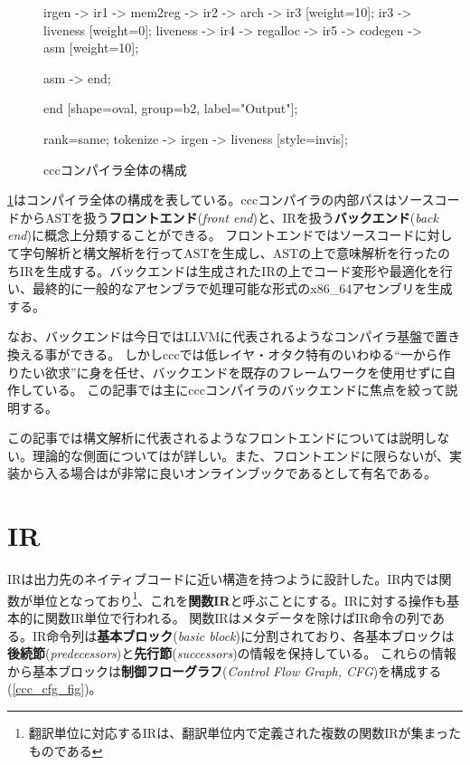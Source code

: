 \documentclass[uplatex,a4paper]{jsarticle}
\begin{document}
\begin{figure}[!ht]
\begin{center}
{{        irgen -> ir1 -> mem2reg -> ir2 -> arch -> ir3  [weight=10];
        ir3 -> liveness [weight=0];
        liveness -> ir4 -> regalloc -> ir5 -> codegen -> asm [weight=10];

      }
      asm -> end;

      end [shape=oval, group=b2, label="Output"];

      { rank=same; tokenize -> irgen -> liveness [style=invis]; }
    }
    \caption{cccコンパイラ全体の構成}
    \label{ccc_arch}
  \end{center}
\end{figure}

\cref{ccc_arch}はコンパイラ全体の構成を表している。cccコンパイラの内部パスはソースコードからASTを扱う\textbf{フロントエンド}(\textit{front end})と、IRを扱う\textbf{バックエンド}(\textit{back end})に概念上分類することができる。
フロントエンドではソースコードに対して字句解析と構文解析を行ってASTを生成し、ASTの上で意味解析を行ったのちIRを生成する。バックエンドは生成されたIRの上でコード変形や最適化を行い、最終的に一般的なアセンブラで処理可能な形式のx86\_64アセンブリを生成する。

なお、バックエンドは今日ではLLVM\cite{TheLLVM}に代表されるようなコンパイラ基盤で置き換える事ができる。
しかしcccでは低レイヤ・オタク特有のいわゆる``一から作りたい欲求''に身を任せ、バックエンドを既存のフレームワークを使用せずに自作している。
この記事では主にcccコンパイラのバックエンドに焦点を絞って説明する。

この記事では構文解析に代表されるようなフロントエンドについては説明しない。理論的な側面については\cite{av2009コンパイラ}が詳しい。また、フロントエンドに限らないが、実装から入る場合は\cite{ruicompilerbook}が非常に良いオンラインブックであるとして有名である。

\clearpage
\section{IR}
\label{ccc_ir}

IRは出力先のネイティブコードに近い構造を持つように設計した。IR内では関数が単位となっており\footnote{翻訳単位に対応するIRは、翻訳単位内で定義された複数の関数IRが集まったものである}、これを\textbf{関数IR}と呼ぶことにする。IRに対する操作も基本的に関数IR単位で行われる。
関数IRはメタデータを除けばIR命令の列である。IR命令列は\textbf{基本ブロック}(\textit{basic block})に分割されており、各基本ブロックは\textbf{後続節}(\textit{predecessors})と\textbf{先行節}(\textit{successors})の情報を保持している。
これらの情報から基本ブロックは\textbf{制御フローグラフ}(\textit{Control Flow Graph, CFG})を構成する(\cref{ccc_cfg_fig})。
\end{document}
